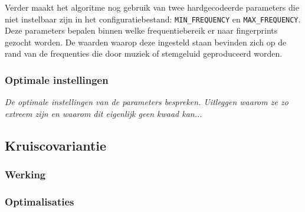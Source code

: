 Verder maakt het algoritme nog gebruik van twee hardgecodeerde parameters die niet instelbaar zijn in het configuratiebestand: \texttt{MIN\_FREQUENCY} en \texttt{MAX\_FREQUENCY}. Deze parameters bepalen binnen welke frequentiebereik er naar fingerprints gezocht worden. De waarden waarop deze ingesteld staan bevinden zich op de rand van de frequenties die door muziek of stemgeluid geproduceerd worden.

\subsubsection{Optimale instellingen}

\textit{De optimale instellingen van de parameters bespreken. Uitleggen waarom ze zo extreem zijn en waarom dit eigenlijk geen kwaad kan...}

\subsection{Kruiscovariantie}


\subsubsection{Werking}



\subsubsection{Optimalisaties}

